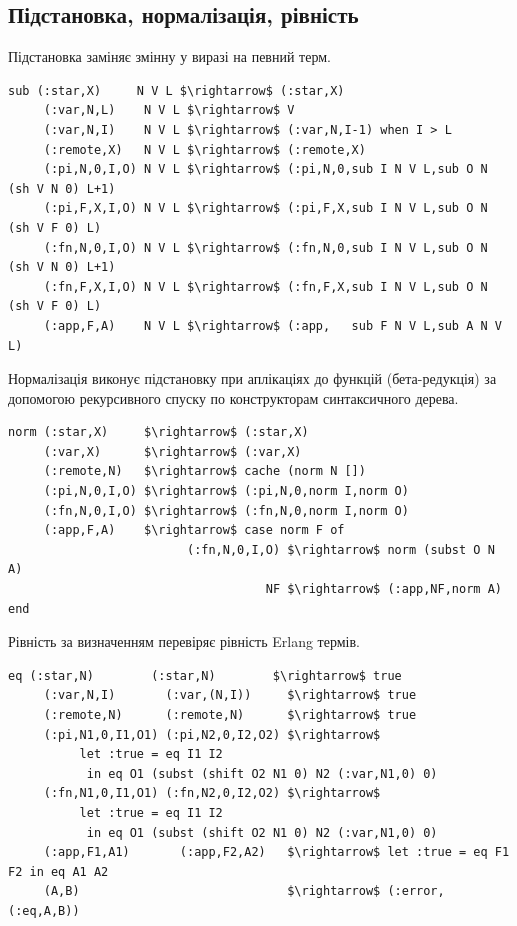 \begin{definition}
\begin{definition}
\begin{definition}
\begin{definition}
\subsection{Підстановка, нормалізація, рівність}
Підстановка заміняє змінну у виразі на певний терм.

\begin{lstlisting}[mathescape=true]
 sub (:star,X)     N V L $\rightarrow$ (:star,X)
     (:var,N,L)    N V L $\rightarrow$ V
     (:var,N,I)    N V L $\rightarrow$ (:var,N,I-1) when I > L
     (:remote,X)   N V L $\rightarrow$ (:remote,X)
     (:pi,N,0,I,O) N V L $\rightarrow$ (:pi,N,0,sub I N V L,sub O N (sh V N 0) L+1)
     (:pi,F,X,I,O) N V L $\rightarrow$ (:pi,F,X,sub I N V L,sub O N (sh V F 0) L)
     (:fn,N,0,I,O) N V L $\rightarrow$ (:fn,N,0,sub I N V L,sub O N (sh V N 0) L+1)
     (:fn,F,X,I,O) N V L $\rightarrow$ (:fn,F,X,sub I N V L,sub O N (sh V F 0) L)
     (:app,F,A)    N V L $\rightarrow$ (:app,   sub F N V L,sub A N V L)
\end{lstlisting}

Нормалізація виконує підстановку при аплікаціях до функцій (бета-редукція)
за допомогою рекурсивного спуску по конструкторам синтаксичного дерева.

\begin{lstlisting}[mathescape=true]
norm (:star,X)     $\rightarrow$ (:star,X)
     (:var,X)      $\rightarrow$ (:var,X)
     (:remote,N)   $\rightarrow$ cache (norm N [])
     (:pi,N,0,I,O) $\rightarrow$ (:pi,N,0,norm I,norm O)
     (:fn,N,0,I,O) $\rightarrow$ (:fn,N,0,norm I,norm O)
     (:app,F,A)    $\rightarrow$ case norm F of
                         (:fn,N,0,I,O) $\rightarrow$ norm (subst O N A)
                                    NF $\rightarrow$ (:app,NF,norm A) end
\end{lstlisting}

Рівність за визначенням перевіряє рівність Erlang термів.

\begin{lstlisting}[mathescape=true]
  eq (:star,N)        (:star,N)        $\rightarrow$ true
     (:var,N,I)       (:var,(N,I))     $\rightarrow$ true
     (:remote,N)      (:remote,N)      $\rightarrow$ true
     (:pi,N1,0,I1,O1) (:pi,N2,0,I2,O2) $\rightarrow$
          let :true = eq I1 I2
           in eq O1 (subst (shift O2 N1 0) N2 (:var,N1,0) 0)
     (:fn,N1,0,I1,O1) (:fn,N2,0,I2,O2) $\rightarrow$
          let :true = eq I1 I2
           in eq O1 (subst (shift O2 N1 0) N2 (:var,N1,0) 0)
     (:app,F1,A1)       (:app,F2,A2)   $\rightarrow$ let :true = eq F1 F2 in eq A1 A2
     (A,B)                             $\rightarrow$ (:error,(:eq,A,B))
\end{lstlisting}


\end{definition}
\end{definition}
\end{definition}
\end{definition}
